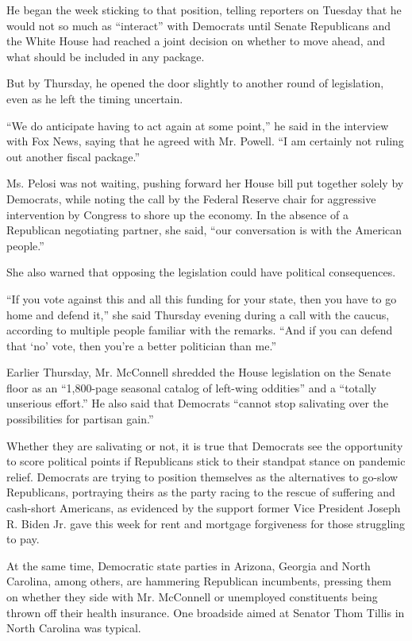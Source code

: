 He began the week sticking to that position, telling reporters on
Tuesday that he would not so much as ``interact'' with Democrats until
Senate Republicans and the White House had reached a joint decision on
whether to move ahead, and what should be included in any package.

But by Thursday, he opened the door slightly to another round of
legislation, even as he left the timing uncertain.

``We do anticipate having to act again at some point,'' he said in the
interview with Fox News, saying that he agreed with Mr. Powell. ``I am
certainly not ruling out another fiscal package.''

Ms. Pelosi was not waiting, pushing forward her House bill put together
solely by Democrats, while noting the call by the Federal Reserve chair
for aggressive intervention by Congress to shore up the economy. In the
absence of a Republican negotiating partner, she said, ``our
conversation is with the American people.''

She also warned that opposing the legislation could have political
consequences.

``If you vote against this and all this funding for your state, then you
have to go home and defend it,'' she said Thursday evening during a call
with the caucus, according to multiple people familiar with the remarks.
``And if you can defend that `no' vote, then you're a better politician
than me.''

Earlier Thursday, Mr. McConnell shredded the House legislation on the
Senate floor as an ``1,800-page seasonal catalog of left-wing oddities''
and a ``totally unserious effort.'' He also said that Democrats ``cannot
stop salivating over the possibilities for partisan gain.''

Whether they are salivating or not, it is true that Democrats see the
opportunity to score political points if Republicans stick to their
standpat stance on pandemic relief. Democrats are trying to position
themselves as the alternatives to go-slow Republicans, portraying theirs
as the party racing to the rescue of suffering and cash-short Americans,
as evidenced by the support former Vice President Joseph R. Biden Jr.
gave this week for rent and mortgage forgiveness for those struggling to
pay.

At the same time, Democratic state parties in Arizona, Georgia and North
Carolina, among others, are hammering Republican incumbents, pressing
them on whether they side with Mr. McConnell or unemployed constituents
being thrown off their health insurance. One broadside aimed at Senator
Thom Tillis in North Carolina was typical.

